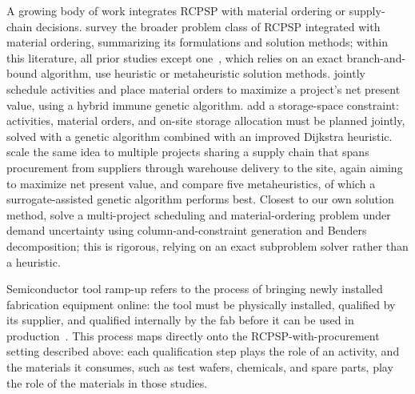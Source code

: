 \documentclass[11pt]{article}
\begin{document}
A growing body of work integrates RCPSP with material ordering or
supply-chain decisions.
\citet{parchamiafra2022review} survey the broader problem class of RCPSP
integrated with material ordering, summarizing its formulations and
solution methods; within this literature, all prior studies except
one~\citep{chiu2002efficient}, which relies on an exact branch-and-bound
algorithm, use heuristic or metaheuristic solution methods.
\citet{asadujjaman2021dcf} jointly schedule activities and place material
orders to maximize a project's net present value, using a hybrid immune
genetic algorithm.
\citet{tian2023storage} add a storage-space constraint: activities, material
orders, and on-site storage allocation must be planned jointly, solved with
a genetic algorithm combined with an improved Dijkstra heuristic.
\citet{asadujjaman2024scircmpsp} scale the same idea to multiple projects
sharing a supply chain that spans procurement from suppliers through
warehouse delivery to the site, again aiming to maximize net present value,
and compare five metaheuristics, of which a surrogate-assisted genetic
algorithm performs best.
Closest to our own solution method, \citet{hu2026robust} solve a
multi-project scheduling and material-ordering problem under demand
uncertainty using column-and-constraint generation and Benders
decomposition; this is rigorous, relying on an exact subproblem solver
rather than a heuristic.


Semiconductor tool ramp-up refers to the process of bringing newly installed fabrication equipment online: the tool must be physically installed, qualified by its supplier, and qualified internally by the fab before it can be used in production~\citep{ieee2013semircpsp}.
This process maps directly onto the RCPSP-with-procurement setting described above: each qualification step plays the role of an activity, and the materials it consumes, such as test wafers, chemicals, and spare parts, play the role of the materials in those studies.
\end{document}
